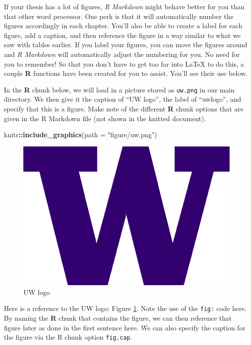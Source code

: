 \documentclass [11pt, proquest] {uwthesis}[2015/03/03]
\newenvironment{Shaded}{\begin{snugshade}}{\end{snugshade}}
\newcommand{\KeywordTok}[1]{\textcolor[rgb]{0.13,0.29,0.53}{\textbf{#1}}}
\newcommand{\DataTypeTok}[1]{\textcolor[rgb]{0.13,0.29,0.53}{#1}}
\newcommand{\StringTok}[1]{\textcolor[rgb]{0.31,0.60,0.02}{#1}}
\newcommand{\OperatorTok}[1]{\textcolor[rgb]{0.81,0.36,0.00}{\textbf{#1}}}
\newcommand{\NormalTok}[1]{#1}
\begin{document}
If your thesis has a lot of figures, \emph{R Markdown} might behave
better for you than that other word processor. One perk is that it will
automatically number the figures accordingly in each chapter. You'll
also be able to create a label for each figure, add a caption, and then
reference the figure in a way similar to what we saw with tables
earlier. If you label your figures, you can move the figures around and
\emph{R Markdown} will automatically adjust the numbering for you. No
need for you to remember! So that you don't have to get too far into
LaTeX to do this, a couple \textbf{R} functions have been created for
you to assist. You'll see their use below.

In the \textbf{R} chunk below, we will load in a picture stored as
\texttt{uw.png} in our main directory. We then give it the caption of
``UW logo'', the label of ``uwlogo'', and specify that this is a figure.
Make note of the different \textbf{R} chunk options that are given in
the R Markdown file (not shown in the knitted document).
\begin{Shaded}
\begin{Highlighting}[]
\NormalTok{knitr}\OperatorTok{::}\KeywordTok{include_graphics}\NormalTok{(}\DataTypeTok{path =} \StringTok{"figure/uw.png"}\NormalTok{)}
\end{Highlighting}
\end{Shaded}
\begin{figure}
\includegraphics[width=6.25in]{figure/uw} \caption{UW logo}\label{fig:uwlogo}
\end{figure}
Here is a reference to the UW logo: Figure \ref{fig:uwlogo}. Note the
use of the \texttt{fig:} code here. By naming the \textbf{R} chunk that
contains the figure, we can then reference that figure later as done in
the first sentence here. We can also specify the caption for the figure
via the R chunk option \texttt{fig.cap}.
\end{document}
